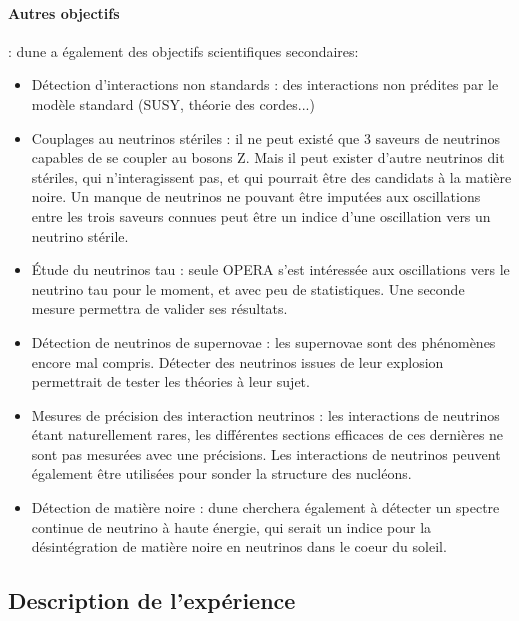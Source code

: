             \paragraph{Autres objectifs} :
                \gls{dune} a également des objectifs scientifiques secondaires:
                \begin{itemize}
                    \item Détection d'interactions non standards : des interactions non prédites par le modèle standard (SUSY, théorie des cordes...)
                    \item Couplages au neutrinos stériles : il ne peut existé que 3 saveurs de neutrinos capables de se coupler au bosons Z\cite{Olive2016}. Mais il peut exister d'autre neutrinos dit stériles, qui n'interagissent pas, et qui pourrait être des candidats à la matière noire. Un manque de neutrinos ne pouvant être imputées aux oscillations entre les trois saveurs connues peut être un indice d'une oscillation vers un neutrino stérile.
                    \item Étude du neutrinos tau : seule OPERA s'est intéressée aux oscillations vers le neutrino tau pour le moment, et avec peu de statistiques. Une seconde mesure permettra de valider ses résultats.
                    \item Détection de neutrinos de supernovae : les supernovae sont des phénomènes encore mal compris. Détecter des neutrinos issues de leur explosion permettrait de tester les théories à leur sujet.
                    \item Mesures de précision des interaction neutrinos : les interactions de neutrinos étant naturellement rares, les différentes sections efficaces de ces dernières ne sont pas mesurées avec une précisions. Les interactions de neutrinos peuvent également être utilisées pour sonder la structure des nucléons.
                    \item Détection de matière noire : \gls{dune} cherchera également à détecter un spectre continue de neutrino à haute énergie, qui serait un indice pour la désintégration de matière noire en neutrinos dans le coeur du soleil\cite{Rott2017}. 
                \end{itemize}
            
        \subsection{Description de l'expérience}
        

